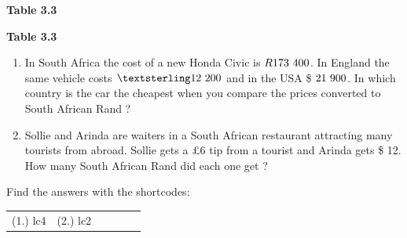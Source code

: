 \begin{enumerate}[noitemsep, label=\textbf{\arabic*}. ]
\begin{table}[H]
\begin{center}
\begin{xtabular}[t]{|l|l|l|}
    \end{xtabular}
      \end{center}
    \begin{center}{\small\bfseries Table 3.3}\end{center}
    \begin{caption}{\small\bfseries Table 3.3}\end{caption}
\end{table}
    \par
  \label{m39335*id68888}\begin{enumerate}[noitemsep, label=\textbf{\alph*}. ] 
            \label{m39335*uid26}\item In South Africa the cost of a new Honda Civic is $R173\phantom{\rule{3.33333pt}{0ex}}400$. In England the same vehicle costs $£12\phantom{\rule{3.33333pt}{0ex}}200$ and in the USA \$ $21\phantom{\rule{3.33333pt}{0ex}}900$. In which country is the car the cheapest when you compare the prices converted to South African Rand ?
\label{m39335*uid27}\item Sollie and Arinda are waiters in a South African restaurant attracting many tourists from abroad. Sollie gets a $£6$ tip from a tourist and Arinda gets \$ 12.
How many South African Rand did each one get ?
\end{enumerate}
        \end{enumerate}
    \label{m39335*cid7}
\par {} Find the answers with the shortcodes:
 \par \begin{tabular}[h]{cccccc}
 (1.) lc4  &  (2.) lc2  & \end{tabular}
